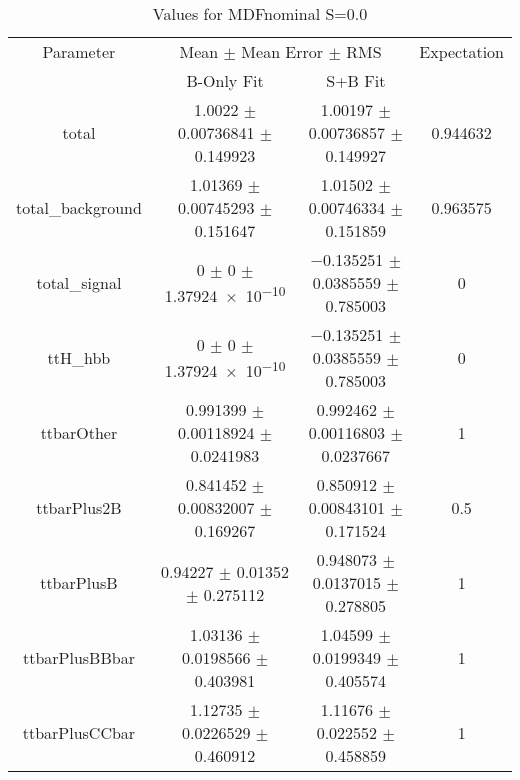 \begin{table}
\centering
\caption{Values for MDFnominal S=0.0}
\begin{tabular}{cccc}
\toprule
Parameter & \multicolumn{2}{c}{Mean $\pm$ Mean Error $\pm$ RMS} & Expectation\\
 & B-Only Fit & S+B Fit & \\
\midrule
total & \num{1.0022} $\pm$ \num{0.00736841} $\pm$ \num{0.149923} & \num{1.00197} $\pm$ \num{0.00736857} $\pm$ \num{0.149927} & \num{0.944632}\\
total\_background & \num{1.01369} $\pm$ \num{0.00745293} $\pm$ \num{0.151647} & \num{1.01502} $\pm$ \num{0.00746334} $\pm$ \num{0.151859} & \num{0.963575}\\
total\_signal & \num{0} $\pm$ \num{0} $\pm$ \num{1.37924e-10} & \num{-0.135251} $\pm$ \num{0.0385559} $\pm$ \num{0.785003} & \num{0}\\
ttH\_hbb & \num{0} $\pm$ \num{0} $\pm$ \num{1.37924e-10} & \num{-0.135251} $\pm$ \num{0.0385559} $\pm$ \num{0.785003} & \num{0}\\
ttbarOther & \num{0.991399} $\pm$ \num{0.00118924} $\pm$ \num{0.0241983} & \num{0.992462} $\pm$ \num{0.00116803} $\pm$ \num{0.0237667} & \num{1}\\
ttbarPlus2B & \num{0.841452} $\pm$ \num{0.00832007} $\pm$ \num{0.169267} & \num{0.850912} $\pm$ \num{0.00843101} $\pm$ \num{0.171524} & \num{0.5}\\
ttbarPlusB & \num{0.94227} $\pm$ \num{0.01352} $\pm$ \num{0.275112} & \num{0.948073} $\pm$ \num{0.0137015} $\pm$ \num{0.278805} & \num{1}\\
ttbarPlusBBbar & \num{1.03136} $\pm$ \num{0.0198566} $\pm$ \num{0.403981} & \num{1.04599} $\pm$ \num{0.0199349} $\pm$ \num{0.405574} & \num{1}\\
ttbarPlusCCbar & \num{1.12735} $\pm$ \num{0.0226529} $\pm$ \num{0.460912} & \num{1.11676} $\pm$ \num{0.022552} $\pm$ \num{0.458859} & \num{1}\\
\bottomrule
\end{tabular}
\end{table}